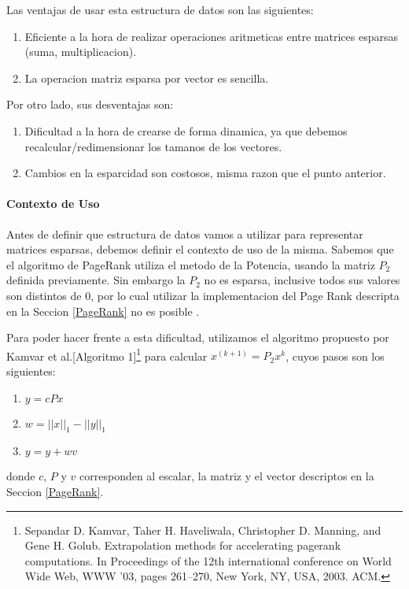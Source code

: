 Las ventajas de usar esta estructura de datos son las siguientes:
\begin{enumerate}
  \item Eficiente a la hora de realizar operaciones aritmeticas entre matrices esparsas (suma, multiplicacion).
  \item La operacion matriz esparsa por vector es sencilla.
\end{enumerate}
Por otro lado, sus desventajas son:
\begin{enumerate}
  \item Dificultad a la hora de crearse de forma dinamica, ya que debemos recalcular/redimensionar los tamanos de los vectores.
  \item Cambios en la esparcidad son costosos, misma razon que el punto anterior.
\end{enumerate}

\paragraph{Contexto de Uso}

Antes de definir que estructura de datos vamos a utilizar para representar matrices esparsas, debemos definir el contexto de uso de la misma.
Sabemos que el algoritmo de PageRank utiliza el metodo de la Potencia, usando la matriz $P_2$ definida previamente. Sin embargo la $P_2$ no es esparsa, inclusive todos sus valores son distintos de 0, por lo cual utilizar la implementacion del Page Rank descripta en la Seccion \ref{PageRank} no es posible .

Para poder hacer frente a esta dificultad, utilizamos el algoritmo propuesto por Kamvar et al.[Algoritmo 1]\footnote{Sepandar D. Kamvar, Taher H. Haveliwala, Christopher D. Manning, and Gene H. Golub.
Extrapolation methods for accelerating pagerank computations. In Proceedings of the 12th
international conference on World Wide Web, WWW ’03, pages 261–270, New York, NY,
USA, 2003. ACM.} para calcular $x^{(k+1)} = P_2x^{k}$, cuyos pasos son los siguientes:
\begin{enumerate}
    \item $y = cPx$
    \item $w = ||x||_1 - ||y||_1$
    \item $y = y + wv$
\end{enumerate}

donde $c$, $P$ y $v$ corresponden al escalar, la matriz y el vector descriptos en la Seccion \ref{PageRank}.

